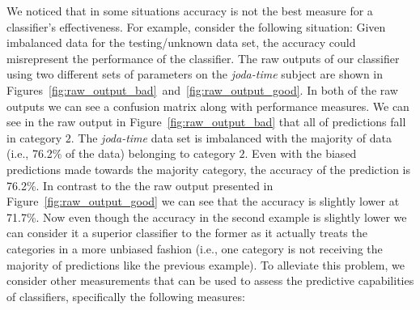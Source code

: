 \begin{sidewaysfigure}[!tb]
  \centering
  \caption{Raw output of training on \emph{joda-time} then predicting on its unknowns using the parameters \emph{cost}=0.03125 and \emph{gamma}=0.0078125.}
  \label{fig:raw_output_bad}
  \begin{minipage}{.95\textheight}
  \scriptsize{
  
  }
  \end{minipage}
  
  \vspace{3em}

  \centering
  \caption{Raw output of training on \emph{joda-time} then predicting on its unknowns using the parameters \emph{cost}=8 and \emph{gamma}=0.125.}
  \label{fig:raw_output_good}
  \begin{minipage}{.95\textheight}
  \scriptsize{
  
  }
  \end{minipage}
\end{sidewaysfigure}
\afterpage\clearpage

We noticed that in some situations accuracy is not the best measure for a classifier's effectiveness. For example, consider the following situation: Given imbalanced data for the testing/unknown data set, the accuracy could misrepresent the performance of the classifier. The raw outputs of our classifier using two different sets of parameters on the \emph{joda-time} subject are shown in Figures~\ref{fig:raw_output_bad}~and~\ref{fig:raw_output_good}. In both of the raw outputs we can see a confusion matrix along with performance measures. We can see in the raw output in Figure~\ref{fig:raw_output_bad} that all of predictions fall in category $2$. The \emph{joda-time} data set is imbalanced with the majority of data (i.e., 76.2\% of the data) belonging to category $2$. Even with the biased predictions made towards the majority category, the accuracy of the prediction is 76.2\%. In contrast to the the raw output presented in Figure~\ref{fig:raw_output_good} we can see that the accuracy is slightly lower at 71.7\%. Now even though the accuracy in the second example is slightly lower we can consider it a superior classifier to the former as it actually treats the categories in a more unbiased fashion (i.e., one category is not receiving the majority of predictions like the previous example). To alleviate this problem, we consider other measurements that can be used to assess the predictive capabilities of classifiers, specifically the following measures:

